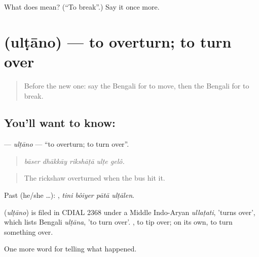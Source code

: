 \begin{tcolorbox}[breakable,colback=teal!4,colframe=teal!35!black,title={Before you move on}]
What does  mean? (\textquotedblleft{}To break\textquotedblright{}.) Say it once more.
\end{tcolorbox}
\section[\texorpdfstring{\bn{উল্টানো} (ulṭāno)}{উল্টানো (ulṭāno)}]{ (ulṭāno) — to overturn; to turn over}

\label{lesson:BN-C278-ultano}



\begin{quote}
Before the new one: say the Bengali for to move, then the Bengali for to break.
\end{quote}

\subsection*{You'll want to know: }
\textbf{} — \emph{ulṭāno} — \textquotedblleft{}to overturn; to turn over\textquotedblright{}.

\begin{quote}
    
\end{quote}

\begin{quote}
\emph{bāser dhākkāy rikshāṭā ulṭe gelô.}
\end{quote}

\begin{quote}
The rickshaw overturned when the bus hit it.
\end{quote}

Past (he/she …):    , \emph{tini bôiyer pātā ulṭālen}.

\begin{cousinweb}
\textbf{} (\emph{ulṭāno}) is filed in CDIAL 2368 under a Middle Indo-Aryan \emph{ullaṭati}, 'turns over', which lists Bengali \emph{ulṭāna}, 'to turn over'.  , to tip over;  on its own, to turn something over.
\end{cousinweb}

\begin{grammarlens}[title={What you've built}]
One more word for telling what happened.
\end{grammarlens}

